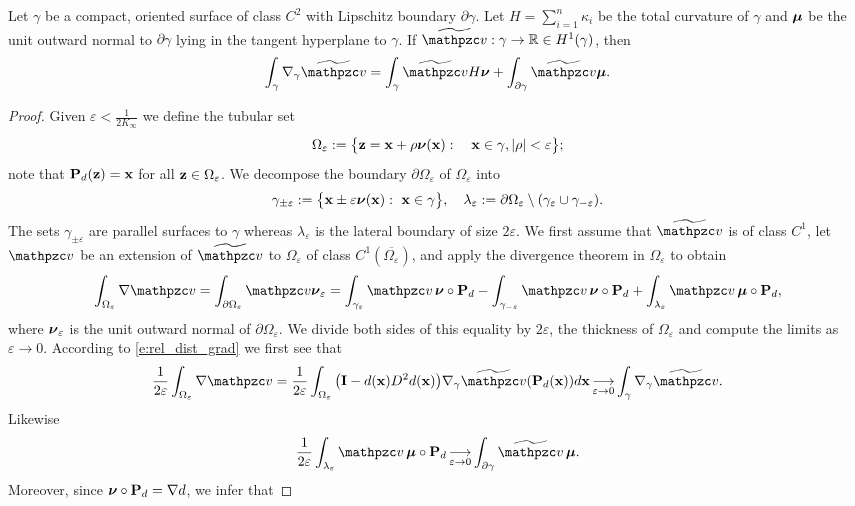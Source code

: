 \begin{proposition}\label{P:diver-thm}
Let $\gamma$ be a compact, oriented surface of class $C^2$ with Lipschitz boundary $\partial\gamma$.
Let $H = \sum_{i=1}^n \kappa_i$ be the total curvature of $\gamma$ and
${\boldsymbol \mu}$ be the unit outward normal to $\partial\gamma$ lying in the tangent hyperplane to
$\gamma$. If $\widetilde \tv:\gamma\to\mathbb{R} \in H^1(\gamma)$, then
%
\[
\int_\gamma \nabla_\gamma \widetilde \tv = \int_\gamma \widetilde \tv H \bnu + \int_{\partial\gamma}\widetilde  \tv \bmu.
\]
%
\end{proposition}  
%
\begin{proof}
Given $\varepsilon < \frac{1}{2 K_\infty}$ we define the tubular set
%
\[
\Omega_\varepsilon := \big\{ {\bf z} =  {\bf x} + \rho {\boldsymbol \nu}({\bf x}):  \quad {\bf x}\in\gamma, |\rho|<\varepsilon  \big\};
\]
%
note that ${\bf P}_d({\bf z})={\bf x}$ for all ${\bf z}\in\Omega_\varepsilon$.
We decompose the boundary $\partial\Omega_\varepsilon$ of $\Omega_\varepsilon$ into
%
\[
\gamma_{\pm\varepsilon} := \big\{ {\bf x} \pm \varepsilon {\boldsymbol \nu}({\bf x}): ~ {\bf x}\in\gamma  \big\},
\quad
\lambda_\varepsilon := \partial \Omega_\varepsilon \setminus (\gamma_\varepsilon\cup\gamma_{-\varepsilon}).
\]
%
The sets $\gamma_{\pm\varepsilon}$ are parallel surfaces to $\gamma$ whereas
$\lambda_\varepsilon$ is the lateral boundary of size $2\varepsilon$. We first
assume that $\widetilde \tv$ is of class $C^1$, let $\tv$
be an extension of $\widetilde \tv$ to $\Omega_\varepsilon$ of class
$C^1(\overline{\Omega_\varepsilon})$,
and apply the divergence theorem in $\Omega_\varepsilon$ to obtain
%
\[
\int_{\Omega_\varepsilon} \nabla \tv = \int_{\partial\Omega_\varepsilon} \tv \bnu_\varepsilon
= \int_{\gamma_\varepsilon} \tv \, \bnu\circ\bP_d- \int_{\gamma_{-\varepsilon}} \tv \, \bnu\circ\bP_d
+ \int_{\lambda_\varepsilon} \tv \, \bmu\circ\bP_d,
\]
%
where ${\boldsymbol \nu}_\varepsilon$ is the unit outward normal of $\partial\Omega_\varepsilon$.
We divide both sides of this equality by $2\varepsilon$, the thickness of $\Omega_\varepsilon$
and compute the limits as $\varepsilon\to0$. According to \eqref{e:rel_dist_grad}
we first see that
%
\[
\frac{1}{2\varepsilon} \int_{\Omega_\varepsilon} \nabla\tv
= \frac{1}{2\varepsilon} \int_{\Omega_\varepsilon} \big(\bI - d(\bx) D^2 d(\bx) \big)
\nabla_\gamma \ttv(\bP_d(\bx)) d\bx
\mathop{\longrightarrow}_{\varepsilon \to 0} \int_\gamma \nabla_\gamma \ttv.
\]
%
Likewise
%
\[
\frac{1}{2\varepsilon} \int_{\lambda_\varepsilon} \tv \, \bmu\circ\bP_d
\mathop{\longrightarrow}_{\varepsilon \to 0} \int_{\partial\gamma} \ttv \, \bmu.
\]
%
Moreover, since ${\boldsymbol \nu}\circ{\bf P}_d = \nabla d$, we infer that

\end{proof}
